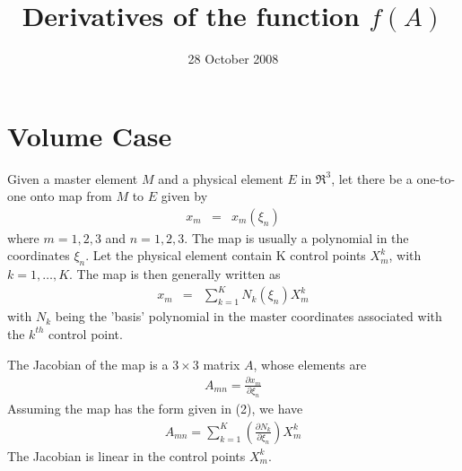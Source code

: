 
\pagestyle{empty}

\title{ {\LARGE\bf Derivatives of the function $f(A)$}}


\date{28 October 2008}



\maketitle

\section{Volume Case}

 \newline
Given a master element $M$ and a physical element 
$E$ in $\Re^3$, 
let there be a one-to-one onto map from $M$ to $E$ given by 
\begin{eqnarray}
x_m & = & x_m ( \xi_n )
\end{eqnarray}
where $m = 1, 2, 3$ and $n = 1, 2, 3$.  The map is usually a polynomial
in the coordinates $\xi_n$.  Let the physical element contain K control 
points $X_m^k$, with $k=1,\ldots,K$. The map is then generally written as 
\begin{eqnarray}
x_m & = & \sum_{k=1}^K N_k (\xi_n) X_m^k
\end{eqnarray}
with $N_k$ being the 'basis' polynomial in the master coordinates associated
with the $k^{th}$ control point. \newline

 \newline
The Jacobian of the map is a $3 \times 3$ matrix
$A$, whose elements are
\begin{eqnarray}
A_{mn} = \frac{\partial x_m}{\partial \xi_n} 
\end{eqnarray}
Assuming the map has the form given in (2), we have
\begin{eqnarray}
A_{mn} = \sum_{k=1}^K \left( \frac{\partial N_k}{\partial \xi_n} \right) X_m^k 
\end{eqnarray}
The Jacobian is linear in the control points $X_m^k$. \newline

